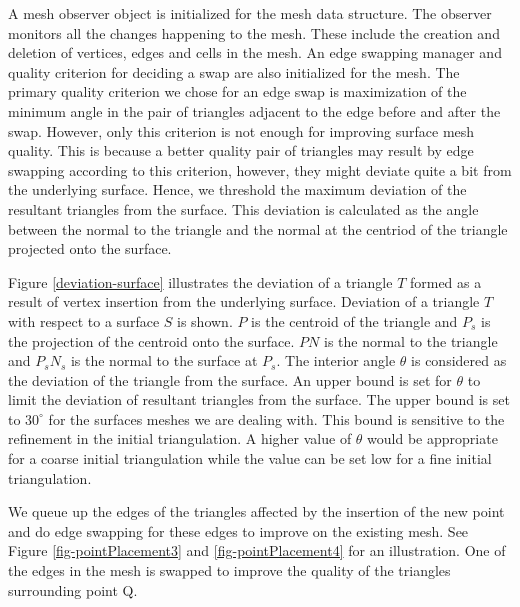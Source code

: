 A mesh observer object is initialized for the mesh data structure. The observer monitors all the changes happening to the mesh. These include the creation and deletion of vertices, edges and cells in the mesh. An edge swapping manager and quality criterion for deciding a swap are also initialized for the mesh. The primary quality criterion we chose for an edge swap is maximization of the minimum angle in the pair of triangles adjacent to the edge before and after the swap. However, only this criterion is not enough for improving surface mesh quality. This is because a better quality pair of triangles may result by edge swapping according to this criterion, however, they might deviate quite a bit from the underlying surface. Hence, we threshold the maximum deviation of the resultant triangles from the surface. This deviation is calculated as the angle between the normal to the triangle and the normal at the centriod of the triangle projected onto the surface. 

Figure \ref{deviation-surface} illustrates the deviation of a triangle $T$ formed as a result of vertex insertion from the underlying surface. Deviation of a triangle $T$ with respect to a surface $S$ is shown. $P$ is the centroid of the triangle and $P_s$ is the projection of the centroid onto the surface. $PN$ is the normal to the triangle and $P_sN_s$ is the normal to the surface at $P_s$. The interior angle $\theta$ is considered as the deviation of the triangle from the surface. An upper bound is set for $\theta$ to limit the deviation of resultant triangles from the surface.  The upper bound is set to ${30}^{\circ}$ for the surfaces meshes we are dealing with. This bound is sensitive to the refinement in the initial triangulation. A higher value of $\theta$ would be appropriate for a coarse initial triangulation while the value can be set low for a fine initial triangulation.

We queue up the edges of the triangles affected by the insertion of the new point and do edge swapping for these edges to improve on the existing mesh. See Figure \ref{fig-pointPlacement3} and \ref{fig-pointPlacement4} for an illustration. One of the edges in the mesh is swapped to improve the quality of the triangles surrounding point Q.


